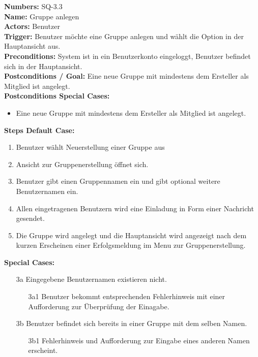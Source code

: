 \documentclass{article}
\begin{document}
\newpage
\vspace{0.5cm}

\begin{samepage}
\textbf{Numbers:} SQ-3.3\\
\textbf{Name:} Gruppe anlegen\\
\textbf{Actors:} Benutzer\\
\textbf{Trigger:} Benutzer möchte eine Gruppe anlegen und wählt die Option in der Hauptansicht aus.\\
\textbf{Preconditions:}  System ist in ein Benutzerkonto eingeloggt, Benutzer befindet sich in der Hauptansicht.\\
\textbf{Postconditions / Goal:} Eine neue Gruppe mit mindestens dem Ersteller als Mitglied ist angelegt.\\
\textbf{Postconditions Special Cases:} 
\begin{itemize}
    \item Eine neue Gruppe mit mindestens dem Ersteller als Mitglied ist angelegt. 
\end{itemize}
\textbf{Steps Default Case:}
\begin{enumerate}
    \item Benutzer wählt Neuerstellung einer Gruppe aus
    \item Ansicht zur Gruppenerstellung öffnet sich.
    \item Benutzer gibt einen Gruppennamen ein und gibt optional weitere Benutzernamen ein.
    \item Allen eingetragenen Benutzern wird eine Einladung in Form einer Nachricht gesendet.
    \item Die Gruppe wird angelegt und die Hauptansicht wird angezeigt nach dem kurzen Erscheinen einer Erfolgsmeldung im Menu zur Gruppenerstellung.
\end{enumerate}
\textbf{Special Cases:}
\begin{itemize}
    \item [3a] Eingegebene Benutzernamen existieren nicht.
    \begin{itemize}
        \item [3a1] Benutzer bekommt entsprechenden Fehlerhinweis mit einer Aufforderung zur Überprüfung der Einagabe.
    \end{itemize}
    \item [3b] Benutzer befindet sich bereits in einer Gruppe mit dem selben Namen. 
    \begin{itemize}
        \item [3b1] Fehlerhinweis und Aufforderung zur Eingabe eines anderen Namen erscheint. 
    \end{itemize}
\end{itemize}
\end{samepage}
\end{document}
